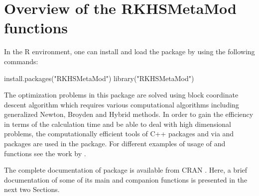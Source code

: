\section{Overview of the RKHSMetaMod functions}\label{sec:Overview}
In the R environment, one can install and load the  package by using the following commands:
\begin{example}
install.packages("RKHSMetaMod")
library("RKHSMetaMod")
\end{example}
The optimization problems in this package are solved using block coordinate descent algorithm which requires various computational algorithms including generalized Newton, Broyden and Hybrid methods. 
In order to gain the efficiency in terms of the calculation time and be able to deal with high dimensional problems, the computationally efficient tools of C++ packages  \citep{eigenweb} and  \citep{galassi2018scientific} via  \citep{RcppEigen} and  \citep{RcppGSL} packages are used in the  package. For different examples of usage of  and  functions see the work by \citet{Eddelbuettel:2013:SRC:2517725}. 

The complete documentation of  package is available from CRAN \citep{rkhsmeamodpackage}. Here, a brief documentation of some of its main and companion functions is presented in the next two Sections.   
